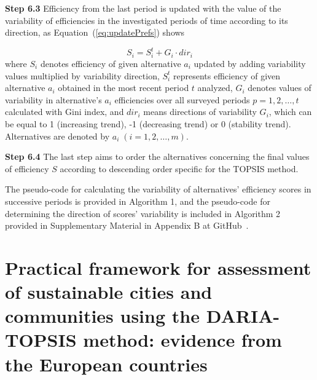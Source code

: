 \documentclass[5p,times]{elsarticle}
\begin{document}
\textbf{Step 6.3} Efficiency from the last period is updated with the value of the variability of efficiencies in the investigated periods of time according to its direction, as Equation~(\ref{eq:updatePrefs}) shows

\begin{equation}
    S_{i} = S_{i}^{t} + G_{i} \cdot dir_{i}
    \label{eq:updatePrefs}
\end{equation}
%
where $S_{i}$ denotes efficiency of given alternative $a_{i}$ updated by adding variability values multiplied by variability direction, $S_{i}^{t}$ represents efficiency of given alternative $a_{i}$ obtained in the most recent period $t$ analyzed, $G_{i}$ denotes values of variability in alternative's $a_{i}$ efficiencies over all surveyed periods $p = 1, 2, \ldots, t$ calculated with Gini index, and $dir_{i}$ means directions of variability $G_{i}$, which can be equal to 1 (increasing trend), -1 (decreasing trend) or 0 (stability trend). Alternatives are denoted by $a_{i} \; (i = 1, 2, \ldots, m)$.

\textbf{Step 6.4} The last step aims to order the alternatives concerning the final values of efficiency $S$ according to descending order specific for the TOPSIS method.

The pseudo-code for calculating the variability of alternatives' efficiency scores in successive periods is provided in Algorithm 1, and the pseudo-code for determining the direction of scores' variability is included in Algorithm 2 provided in Supplementary Material in Appendix B at GitHub~\cite{dariagithub2022}.

\section{Practical framework for assessment of sustainable cities and communities using the DARIA-TOPSIS method: evidence from the European countries}
\label{sec:frameworkCaseStudy}
\end{document}
